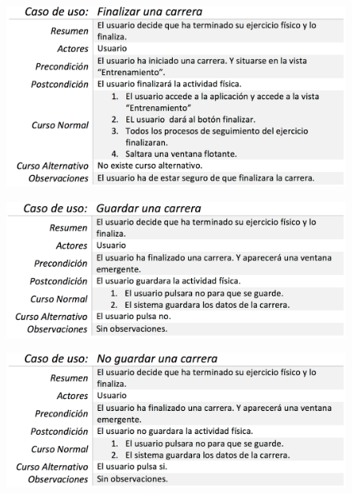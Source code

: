 \documentclass[a4paper, 11pt]{article}
\begin{document}
\begin{itemize}
            \begin{figure}[H]
              \centering
              \includegraphics[width=1\textwidth]{finalizar-una-carrera}
            \end{figure}

            \begin{figure}[H]
              \centering
              \includegraphics[width=1\textwidth]{guardar-una-carrera}
            \end{figure}

            \begin{figure}[H]
              \centering
              \includegraphics[width=1\textwidth]{no-guardar-una-carrera}
            \end{figure}


\end{itemize}
\end{document}
